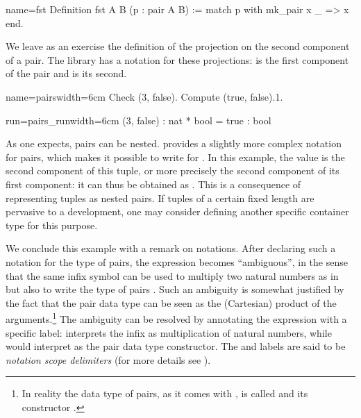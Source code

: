 \begin{coq}{name=fst}{}
Definition fst A B (p : pair A B) :=
  match p with mk_pair x _ => x end.
\end{coq}

We leave as an exercise the definition of the projection on the second
component of a pair. The \mcbMC{} library has a notation for these
projections:  is the first component of the pair 
and  is its second.

\begin{coq-left}{name=pairs}{width=6cm}
Check (3, false).
Compute (true, false).1.
\end{coq-left}
\begin{coqout-right}{run=pairs_run}{width=6cm}
(3, false) : nat * bool
 = true : bool
\end{coqout-right}

As one expects, pairs can be nested. \Coq{} provides a slightly more complex
notation for pairs, which makes it possible to write  for
. In this example, the value  is the second
component of this tuple, or more precisely the second component of its
first component: it can thus be obtained as . This is a
consequence of representing tuples as nested pairs. If
tuples of a certain fixed length are pervasive to a development, one
may consider defining another specific container type for this
purpose. %

We conclude this example with a remark on notations. After declaring
such a notation for the type of pairs, the expression 
becomes ``ambiguous'',
in the sense that the same infix \C{*} symbol can be used to multiply two
natural numbers as in  but also to write the type of pairs .  Such an ambiguity is somewhat justified by the fact that the pair
data type can be seen as the (Cartesian) product of the arguments.\footnote{In reality the data type of pairs, as it comes with \Coq{}, is called  and its constructor .}  The
ambiguity can be resolved by annotating the expression with a specific
label:  interprets the infix \C{*} as multiplication of natural numbers,
while  would interpret \C{*} as the pair data type
constructor. The  and  labels are said to be
\emph{notation scope delimiters} (for more details see
\cite[``Interpretation scopes'']{Coq:manual}).

